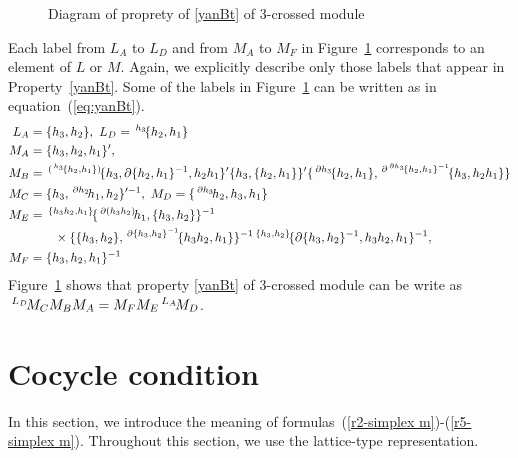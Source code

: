\documentclass{tac}
\newcommand{\act}[1]{\,\sp{#1}\!}
\begin{document}
\begin{appendices}
\begin{figure}[htbp]
\begin{center}
{
  }
\end{center}
\caption{Diagram of proprety of \ref{yanBt} of 3-crossed module}
\label{d:yanBt}
\end{figure}

Each label from $L_A$ to $L_D$ and from $M_A$ to $M_F$ in Figure~\ref{d:yanBt} corresponds to an element of $L$ or $M$. Again, we explicitly describe only those labels that appear in Property~\ref{yanBt}. Some of the labels in Figure~\ref{d:yanBt} can be written as in equation~(\ref{eq:yanBt}).
\begin{equation}
\label{eq:yanBt}
    \begin{aligned}
L_A &= \{h_3,h_2\}, \ 
L_D = \act{h_3}\{h_2,h_1\} \\
M_A &= \{h_3,h_2,h_1\}' , \\
M_B &=\act{(\act{h_3}\{h_2,h_1\})}\{h_3,\partial\{h_2,h_1\}^{-1},h_2h_1\}'\{h_3,\{h_2,h_1\}\}' \{\act{\partial h_3}\{h_2,h_1\},\act{\partial\act{\partial h_3}\{h_2,h_1\}^{-1}}\{h_3,h_2h_1\}\} \\
M_C &= \{h_3,\act{\partial h_2}h_1,h_2\}'^{-1}, \ 
M_D = \{\act{\partial h_3}h_2,h_3,h_1\}\\
M_E &=\act{\{h_3h_2,h_1\}}\{\act{\partial(h_3h_2)}h_1,\{h_3,h_2\}\}^{-1}\\
&\ \ \ \ \ \ \times\{\{h_3,h_2\},\act{\partial\{h_3,h_2\}^{-1}}\{h_3h_2,h_1\}\}^{-1}\act{\{h_3,h_2\}}\{\partial\{h_3,h_2\}^{-1},h_3h_2,h_1\}^{-1}, \\ 
M_F &=\{h_3,h_2,h_1\}^{-1}
\end{aligned}
\end{equation}
Figure~\ref{d:yanBt} shows that property \ref{yanBt} of 3-crossed module can be write as $\act{L_D}M_C M_B M_A = M_F M_E \act{L_A}M_D$.

\section{Cocycle condition}
\label{cocycle}

In this section, we introduce the meaning of formulas~(\ref{r2-simplex m})-(\ref{r5-simplex m}). Throughout this section, we use the lattice-type representation.


\end{appendices}
\end{document}
